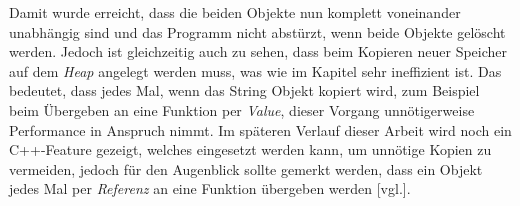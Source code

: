 Damit wurde erreicht, dass die beiden Objekte nun komplett voneinander unabhängig sind und das
Programm nicht abstürzt, wenn beide Objekte gelöscht werden.
\newline
\newline
Jedoch ist gleichzeitig auch zu sehen, dass beim Kopieren neuer Speicher auf dem \emph{Heap}
angelegt werden muss, was wie im Kapitel \emph{} sehr ineffizient ist. Das
bedeutet, dass jedes Mal, wenn das String Objekt kopiert wird, zum Beispiel beim Übergeben an eine
Funktion per \emph{Value}, dieser Vorgang unnötigerweise Performance in Anspruch nimmt. Im
späteren Verlauf dieser Arbeit wird noch ein C++-Feature gezeigt, welches eingesetzt werden kann,
um unnötige Kopien zu vermeiden, jedoch für den Augenblick sollte gemerkt werden, dass ein Objekt
jedes Mal per \emph{Referenz} an eine Funktion übergeben werden \cite{ChernoCopy}[vgl.].